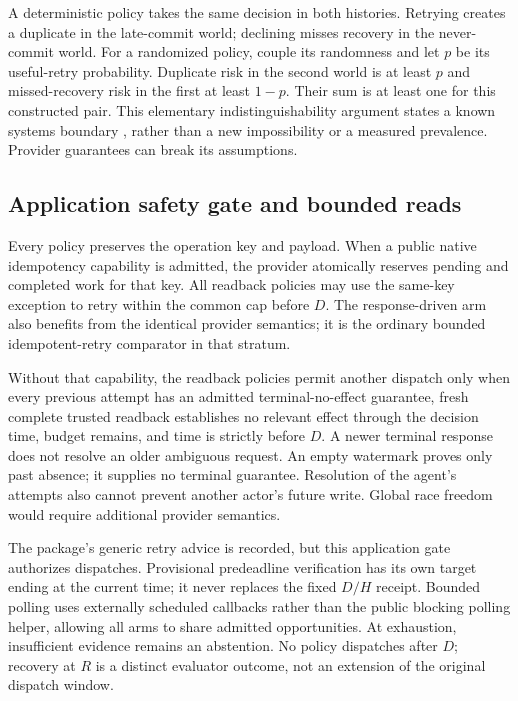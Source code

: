 \documentclass[conference]{IEEEtran}
\begin{document}
A deterministic policy takes the same decision in both histories. Retrying creates a duplicate in the late-commit world; declining misses recovery in the never-commit world. For a randomized policy, couple its randomness and let $p$ be its useful-retry probability. Duplicate risk in the second world is at least $p$ and missed-recovery risk in the first at least $1-p$. Their sum is at least one for this constructed pair. This elementary indistinguishability argument states a known systems boundary \cite{limbo}, rather than a new impossibility or a measured prevalence. Provider guarantees can break its assumptions.

\subsection{Application safety gate and bounded reads}

Every policy preserves the operation key and payload. When a public native idempotency capability is admitted, the provider atomically reserves pending and completed work for that key. All readback policies may use the same-key exception to retry within the common cap before $D$. The response-driven arm also benefits from the identical provider semantics; it is the ordinary bounded idempotent-retry comparator in that stratum.

Without that capability, the readback policies permit another dispatch only when every previous attempt has an admitted terminal-no-effect guarantee, fresh complete trusted readback establishes no relevant effect through the decision time, budget remains, and time is strictly before $D$. A newer terminal response does not resolve an older ambiguous request. An empty watermark proves only past absence; it supplies no terminal guarantee. Resolution of the agent's attempts also cannot prevent another actor's future write. Global race freedom would require additional provider semantics.

The package's generic retry advice is recorded, but this application gate authorizes dispatches. Provisional predeadline verification has its own target ending at the current time; it never replaces the fixed $D/H$ receipt. Bounded polling uses externally scheduled callbacks rather than the public blocking polling helper, allowing all arms to share admitted opportunities. At exhaustion, insufficient evidence remains an abstention. No policy dispatches after $D$; recovery at $R$ is a distinct evaluator outcome, not an extension of the original dispatch window.
\end{document}
